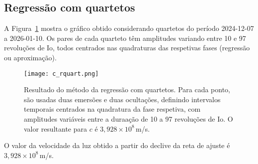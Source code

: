 \documentclass[]{article}
\begin{document}
\subsection{Regressão com quartetos}
A Figura~\ref{fig:bb} mostra o gráfico obtido considerando quartetos do período
2024-12-07 a 2026-01-10. Os pares de cada quarteto têm amplitudes variando entre
10 e 97 revoluções de Io, todos centrados nas quadraturas das respetivas fases
(regressão ou aproximação).
\begin{figure}[htb]
  \begin{center}
    \texttt{[image: c\_rquart.png]}
  \end{center}
  \caption{\label{fig:bb}Resultado do método da regressão com quartetos. Para
  cada ponto, são usadas duas emersões e duas ocultações, definindo intervalos
  temporais centrados na quadratura da fase respetiva, com amplitudes variáveis
  entre a duraação de 10 a 97 revoluções de Io. O valor resultante para $c$ é
$3,928\times10^8$\,m/s.}
\end{figure}
O valor da velocidade da luz obtido a partir do declive da reta de ajuste é
$3,928\times10^8\,$m/s.


\end{document}
